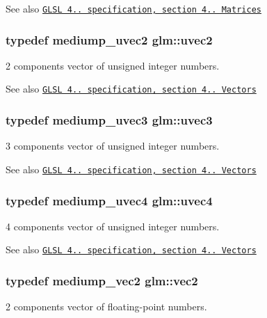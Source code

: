 \begin{DoxySeeAlso}{\-See also}
\href{http://www.opengl.org/registry/doc/GLSLangSpec.4.20.8.pdf}{\tt \-G\-L\-S\-L 4.. specification, section 4.. \-Matrices} 
\end{DoxySeeAlso}
\hypertarget{group__core__types_gad0643cb47b927024ccf4979b0e9a903d}{
\subsubsection[{uvec2}]{\setlength{\rightskip}{0pt plus 5cm}typedef mediump\-\_\-uvec2 {\bf glm\-::uvec2}}}\label{group__core__types_gad0643cb47b927024ccf4979b0e9a903d}
2 components vector of unsigned integer numbers.

\begin{DoxySeeAlso}{\-See also}
\href{http://www.opengl.org/registry/doc/GLSLangSpec.4.20.8.pdf}{\tt \-G\-L\-S\-L 4.. specification, section 4.. \-Vectors} 
\end{DoxySeeAlso}
\hypertarget{group__core__types_ga713379218af0a01d0a7b1e631066106c}{
\subsubsection[{uvec3}]{\setlength{\rightskip}{0pt plus 5cm}typedef mediump\-\_\-uvec3 {\bf glm\-::uvec3}}}\label{group__core__types_ga713379218af0a01d0a7b1e631066106c}
3 components vector of unsigned integer numbers.

\begin{DoxySeeAlso}{\-See also}
\href{http://www.opengl.org/registry/doc/GLSLangSpec.4.20.8.pdf}{\tt \-G\-L\-S\-L 4.. specification, section 4.. \-Vectors} 
\end{DoxySeeAlso}
\hypertarget{group__core__types_gae85130f09c272fcd64da1353c09dddef}{
\subsubsection[{uvec4}]{\setlength{\rightskip}{0pt plus 5cm}typedef mediump\-\_\-uvec4 {\bf glm\-::uvec4}}}\label{group__core__types_gae85130f09c272fcd64da1353c09dddef}
4 components vector of unsigned integer numbers.

\begin{DoxySeeAlso}{\-See also}
\href{http://www.opengl.org/registry/doc/GLSLangSpec.4.20.8.pdf}{\tt \-G\-L\-S\-L 4.. specification, section 4.. \-Vectors} 
\end{DoxySeeAlso}
\hypertarget{group__core__types_ga66d091b759687504ab01365fbd33a1dd}{
\subsubsection[{vec2}]{\setlength{\rightskip}{0pt plus 5cm}typedef mediump\-\_\-vec2 {\bf glm\-::vec2}}}\label{group__core__types_ga66d091b759687504ab01365fbd33a1dd}
2 components vector of floating-\/point numbers.

